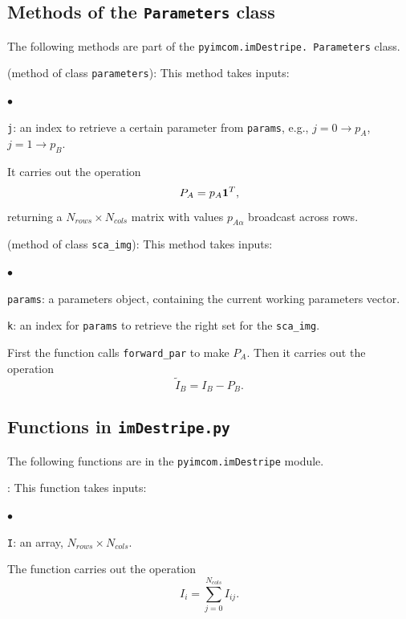 \documentclass[]{pasj01}
\begin{document}
\subsection{Methods of the {\tt Parameters} class}

The following methods are part of the {\tt pyimcom.imDestripe. Parameters} class.

\vskip 0.1in

(method of class {\tt parameters}): This method takes inputs: 
\begin{list}{$\bullet$}{}
\item {\tt j}: an index  to retrieve a certain parameter from {\tt params}, e.g., $j=0\to p_{A}$, $j=1\to p_{B}$.
\end{list}
It carries out the operation
\begin{equation}
    P_A = p_{A}{\textbf{1}}^{\rm T},
\end{equation}
returning a $N_{rows}\times N_{cols}$ matrix with values $p_{A\alpha}$ broadcast across rows.

\vskip 0.1in

 (method of class {\tt sca\_img}): This method takes inputs: 
\begin{list}{$\bullet$}{}
\item {\tt params}: a parameters object, containing the current working parameters vector.
\item {\tt k}: an index for {\tt params} to retrieve the right set for the {\tt sca\_img}.
\end{list}
First the function calls {\tt forward\_par} to make $P_A$. Then it carries out the operation
\begin{equation}
    \tilde{I}_B = I_B - P_B.
\end{equation}

\subsection{Functions in {\tt imDestripe.py}}

The following functions are in the {\tt pyimcom.imDestripe} module.

\vskip0.1in

: This function takes inputs: 
\begin{list}{$\bullet$}{}
\item {\tt I}: an array, $N_{rows}\times N_{cols}$.
\end{list}
The function carries out the operation
\begin{equation}
    I_i= \sum_{j=0}^{N_{cols}}I_{ij}.
\end{equation}
\end{document}
